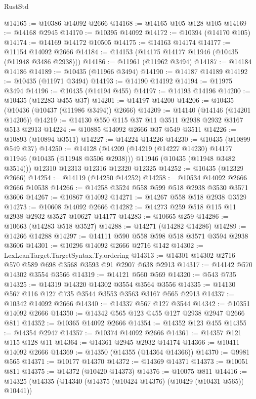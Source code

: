 \begin{lexlean}{RustStd}
\begin{coremodule}
@14165 := @10386 @14092 @2666
@14168 := @14165 @105 @128 @105
@14169 := @14168 @2945
@14170 := @10395 @14092
@14172 := @10394 (@14170 @105)
@14174 := @14169 @14172 @10505
@14175 := @14163 @14174
@14177 := @11154 @14092 @2666
@14184 := @14153 (@14175 @14177 @11946 (@10435 (@11948 @3486 @2938)))
@14186 := @11961 (@11962 @3494)
@14187 := @14184 @14186
@14189 := @10435 (@11966 @3494)
@14190 := @14187 @14189
@14192 := @10435 (@11971 @3494)
@14193 := @14190 @14192
@14194 := @11975 @3494
@14196 := @10435 (@14194 @455)
@14197 := @14193 @14196
@14200 := @10435 (@12283 @455 @37)
@14201 := @14197 @14200
@14206 := @10435 (@10436 (@10437 (@11986 @3494)) @2666)
@14209 := @14140 (@14146 (@14201 @14206))
@14219 := @14130 @550 @115 @37 @11 @3511 @2938 @2932 @3167 @513 @2913
@14224 := @10885 @14092 @2666 @37 @549 @3511
@14226 := @10893 (@10894 @3511)
@14227 := @14224 @14226
@14230 := @10435 (@10899 @549 @37)
@14250 := @14128
    (@14209
      (@14219 (@14227 @14230) @14177 @11946 (@10435 (@11948 @3506 @2938)))
      @11946
      (@10435 (@11948 @3482 @3514)))
    @12310
    @12313
    @12316
    @12320
    @12325
@14252 := @10435 (@12329 @2666)
@14254 := @14119 (@14250 @14252)
@14258 := @10534 @14092 @2666 @2666 @10538
@14266 := @14258 @3524 @558 @599 @518 @2938 @3530 @3571 @3606
@14267 := @10867 @14092
@14271 := @14267 @558 @518 @2938 @3529
@14273 := @10608 @14092 @2666
@14282 := @14273 @259 @518 @115 @11 @2938 @2932 @3527 @10627 @14177
@14283 := @10665 @259
@14286 := @10663 (@14283 @518 @3527)
@14288 := @14271 (@14282 @14286)
@14289 := @14266 @14288
@14297 := @14111 @590 @558 @598 @518 @3571 @3594 @2938 @3606
@14301 := @10296 @14092 @2666 @2716 @142
@14302 := LexLeanTarget.TargetSyntax.Ty.ordering
@14313 := @14301 @14302 @2716 @570 @589 @698 @3568 @3593 @91 @2907 @638 @2913
@14317 := @14142 @570 @14302 @3554 @3566
@14319 := @14121 @560 @569
@14320 := @543 @735
@14325 := @14319 @14320 @14302 @3554 @3564 @3556
@14335 := @14130 @567 @116 @127 @735 @3544 @3553 @3563 @3167 @565 @2913
@14337 := @10342 @14092 @2666
@14340 := @14337 @567 @127 @3544
@14342 := @10351 @14092 @2666
@14350 := @14342 @565 @123 @455 @127 @2938 @2947 @2666 @811
@14352 := @10365 @14092 @2666
@14354 := @14352 @123 @455
@14355 := @14354 @2947
@14357 := @10374 @14092 @2666
@14361 := @14357 @121 @115 @128 @11
@14364 := @14361 @2945 @2932 @14174
@14366 := @10411 @14092 @2666
@14369 := @14350 (@14355 (@14364 @14366))
@14370 := @9981 @565
@14371 := @10177 @14370
@14372 := @14369 @14371
@14373 := @10051 @811
@14375 := @14372 (@10420 @14373)
@14376 := @10075 @811
@14416 := @14325
    (@14335
      (@14340 (@14375 (@10424 @14376) (@10429 (@10431 @565)) @10441))

\end{coremodule}
\end{lexlean}
